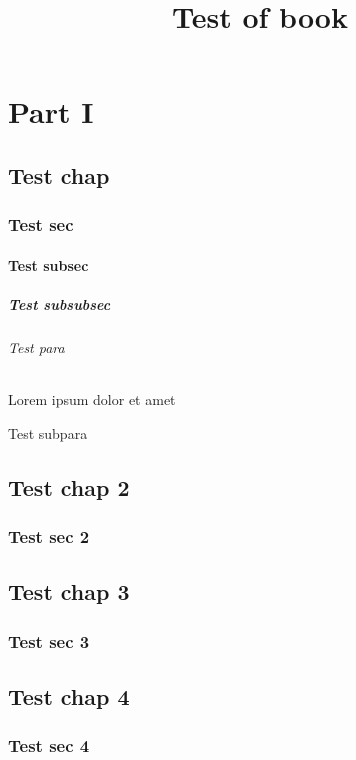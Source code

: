 \documentclass{book}
\title{Test of book}
\begin{document}
    \frontmatter
    \tableofcontents
    
    \part{Part I}
    \chapter{Test chap}
    \section{Test sec}
    \subsection{Test subsec}
    \subsubsection{Test subsubsec}
    \paragraph{Test para} Lorem ipsum dolor et amet
    \subparagraph{Test subpara}
    
    \chapter{Test chap 2}
    \section{Test sec 2}
    
    \mainmatter
    \chapter{Test chap 3}
    \section{Test sec 3}
    
    \chapter{Test chap 4}
    \section{Test sec 4}
    
\end{document}
